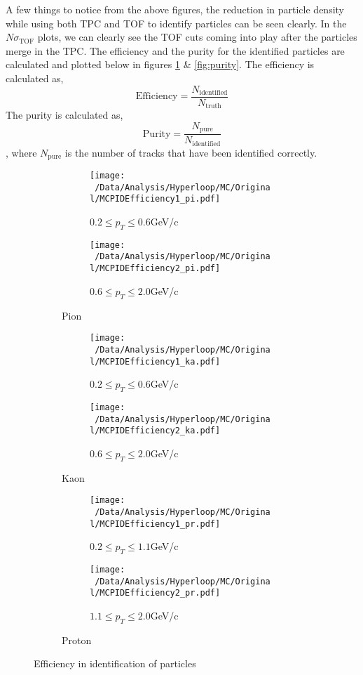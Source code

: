 \documentclass[12pt,a4paper,twoside]{report}
\begin{document}
A few things to notice from the above figures, the reduction in particle density while using both TPC and TOF to identify particles can be seen clearly. In the $N\sigma_\mathrm{TOF}$ plots, we can clearly see the TOF cuts coming into play after the particles merge in the TPC.
The efficiency and the purity for the identified particles are calculated and plotted below in figures \ref{fig:efficiency} \& \ref{fig:purity}. The efficiency is calculated as,
\[\mathrm{Efficiency}=\frac{N_{\mathrm{identified}}}{N_{\mathrm{truth}}}\]
The purity is calculated as,
\[\mathrm{Purity}=\frac{N_{\mathrm{pure}}}{N_{\mathrm{identified}}}\]
, where $N_\mathrm{pure}$ is the number of tracks that have been identified correctly.
\newpage
\begin{figure}[H]
	\begin{subfigure}{\linewidth}
	\begin{subfigure}{0.49\linewidth}
	\texttt{[image: ~/Data/Analysis/Hyperloop/MC/Original/MCPIDEfficiency1\_pi.pdf]}
	\caption*{$0.2\leq p_T \leq 0.6$GeV/c}
	\end{subfigure}
	\begin{subfigure}{0.49\linewidth}
	\texttt{[image: ~/Data/Analysis/Hyperloop/MC/Original/MCPIDEfficiency2\_pi.pdf]}
	\caption*{$0.6\leq p_T \leq 2.0$GeV/c}
	\end{subfigure}
	\caption{Pion}
	\end{subfigure}
	\begin{subfigure}{\linewidth}
	\begin{subfigure}{0.49\linewidth}
	\texttt{[image: ~/Data/Analysis/Hyperloop/MC/Original/MCPIDEfficiency1\_ka.pdf]}
	\caption*{$0.2\leq p_T \leq 0.6$GeV/c}
	\end{subfigure}
	\begin{subfigure}{0.49\linewidth}
	\texttt{[image: ~/Data/Analysis/Hyperloop/MC/Original/MCPIDEfficiency2\_ka.pdf]}
	\caption*{$0.6\leq p_T \leq 2.0$GeV/c}
	\end{subfigure}
	\caption{Kaon}
	\end{subfigure}
	\begin{subfigure}{\linewidth}
	\begin{subfigure}{0.49\linewidth}
	\texttt{[image: ~/Data/Analysis/Hyperloop/MC/Original/MCPIDEfficiency1\_pr.pdf]}
	\caption*{$0.2\leq p_T \leq 1.1$GeV/c}
	\end{subfigure}
	\begin{subfigure}{0.49\linewidth}
	\texttt{[image: ~/Data/Analysis/Hyperloop/MC/Original/MCPIDEfficiency2\_pr.pdf]}
	\caption*{$1.1\leq p_T \leq 2.0$GeV/c}
	\end{subfigure}
	\caption{Proton}
	\end{subfigure}
	\caption{\label{fig:efficiency}Efficiency in identification of particles}
\end{figure}
\end{document}
